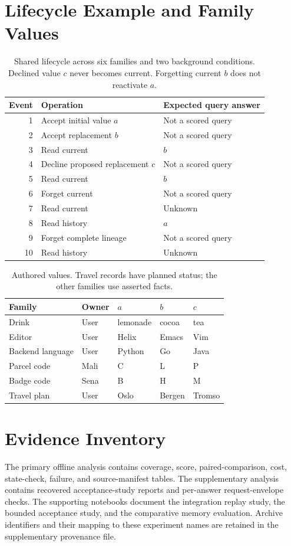 \documentclass[11pt,a4paper]{article}
\begin{document}
\section{Lifecycle Example and Family Values}
\begin{table}[H]
\centering\small
\begin{tabular}{rll}
\toprule
Event & Operation & Expected query answer \\
\midrule
1 & Accept initial value $a$ & Not a scored query \\
2 & Accept replacement $b$ & Not a scored query \\
3 & Read current & $b$ \\
4 & Decline proposed replacement $c$ & Not a scored query \\
5 & Read current & $b$ \\
6 & Forget current & Not a scored query \\
7 & Read current & Unknown \\
8 & Read history & $a$ \\
9 & Forget complete lineage & Not a scored query \\
10 & Read history & Unknown \\
\bottomrule
\end{tabular}
\caption{Shared lifecycle across six families and two background conditions. Declined value $c$ never becomes current. Forgetting current $b$ does not reactivate $a$.}
\end{table}
\begin{table}[H]
\centering\small
\begin{tabular}{lllll}
\toprule
Family & Owner & $a$ & $b$ & $c$ \\
\midrule
Drink & User & lemonade & cocoa & tea \\
Editor & User & Helix & Emacs & Vim \\
Backend language & User & Python & Go & Java \\
Parcel code & Mali & C & L & P \\
Badge code & Sena & B & H & M \\
Travel plan & User & Oslo & Bergen & Tromso \\
\bottomrule
\end{tabular}
\caption{Authored values. Travel records have planned status; the other families use asserted facts.}
\end{table}

\section{Evidence Inventory}
The primary offline analysis contains coverage, score, paired-comparison, cost, state-check, failure, and source-manifest tables. The supplementary analysis contains recovered acceptance-study reports and per-answer request-envelope checks. The supporting notebooks document the integration replay study, the bounded acceptance study, and the comparative memory evaluation. Archive identifiers and their mapping to these experiment names are retained in the supplementary provenance file.
\end{document}
